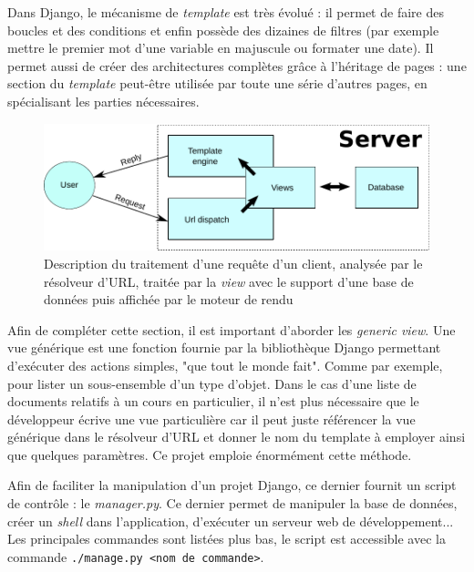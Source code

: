\documentclass[a4paper,12pt]{article}
\begin{document}
Dans Django, le mécanisme de \textit{template} est très évolué : il permet
de faire des boucles et des conditions et enfin possède des dizaines de filtres (par
exemple mettre le premier mot d'une variable en majuscule ou formater une date).
Il permet aussi de créer des architectures complètes grâce à l'héritage de pages :
une section du \textit{template} peut-être utilisée par toute une série d'autres
pages, en spécialisant les parties nécessaires.

\begin{figure}
  \centering\includegraphics[scale=0.8]{imgs/mvc.pdf}
  \caption{Description du traitement d'une requête d'un client, analysée par
           le résolveur d'URL, traitée par la \textit{view} avec le support
           d'une base de données puis affichée par le moteur de rendu}
  \label{fig:mvc}
\end{figure}

Afin de compléter cette section, il est important d'aborder les \textit{generic view}.
Une vue générique est une fonction fournie par la bibliothèque Django permettant
d'exécuter des actions simples, "que tout le monde fait". Comme par exemple, pour lister
un sous-ensemble d'un type d'objet. Dans
le cas d'une liste de documents relatifs à un cours en particulier, il n'est plus nécessaire que le développeur
écrive une vue particulière car il peut juste référencer la vue
générique dans le résolveur d'URL et donner le nom du template à employer
ainsi que quelques paramètres. Ce projet emploie énormément cette méthode. 

Afin de faciliter la manipulation d'un projet Django, ce dernier fournit un script
de contrôle : le \textit{manager.py}. Ce dernier permet de manipuler la base de
données, créer un \textit{shell} dans l'application, d'exécuter un serveur
web de développement... Les principales commandes sont listées plus bas, le
script est accessible avec la commande \texttt{./manage.py <nom de commande>}.
\end{document}
